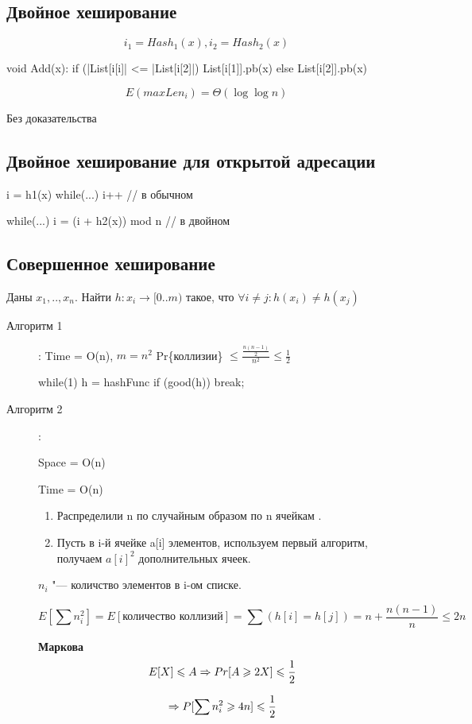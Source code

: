 \subsection{Двойное хеширование}
$$i_1 = Hash_1(x), i_2 = Hash_2(x)$$
\begin{cppcode}
void Add(x):
    if (|List[i[i]| <= |List[i[2]|) {
        List[i[1]].pb(x)
    } else {
        List[i[2]].pb(x)
    }
\end{cppcode}

\begin{lemma}{}
 $$E(max Len_i) = \Theta(\log \log n)$$
 
 Без доказательства
\end{lemma}


\subsection{Двойное хеширование для открытой адресации}

\begin{cppcode}
i = h1(x)
while(...) i++  // в обычном 

while(...) i = (i + h2(x)) mod n // в двойном
\end{cppcode}

\subsection{Совершенное хеширование} 

Даны $x_1,..,x_n$. Найти $h\colon x_i\rightarrow [0..m)$ такое, что  $\forall i \neq j\colon h(x_i) \neq h(x_j)$
\begin{description}
\item[Алгоритм 1]: Time = O(n), $m = n^2$
Pr\{коллизии\} $\le \frac{\frac{n(n-1)}{2}}{n^2} \le \frac{1}{2}$

\begin{cppcode}
while(1) {
    h = hashFunc
    if (good(h)) {
        break;
    }
}
\end{cppcode}

\item[Алгоритм 2]: 

Space = O(n)

Time = O(n)

\begin{enumerate}
\item Распределили n по случайным образом по n ячейкам . 
\item  Пусть в i-й ячейке a[i] элементов, используем первый алгоритм, 
получаем $a[i]^2$ дополнительных ячеек. 
\end{enumerate}

$n_i$ "--- количство элементов в i-ом списке.

$$E[\sum n_i^2] = E[\text{количество коллизий}] = \sum(h[i] = h[j]) = n + \frac{n(n - 1)}{n} \le 2n$$

\begin{lemma}{\bf Маркова}
$$E[X] \leqslant A \Rightarrow Pr[A \geqslant 2X] \leqslant \frac{1}{2}$$
\end{lemma}

$$\Rightarrow P[\sum n_i^2 \geqslant 4n] \leqslant \frac{1}{2}$$
\end{description} 



